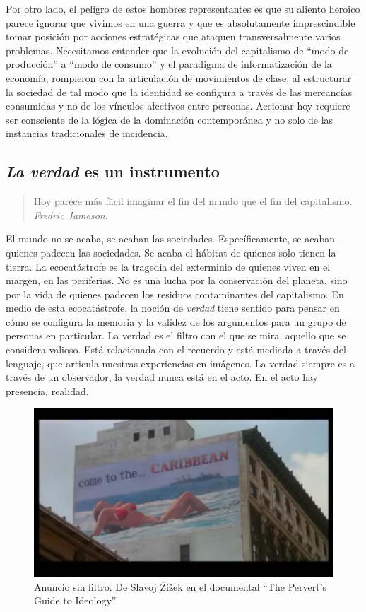 Por otro lado, el peligro de estos hombres representantes es que su aliento heroico parece ignorar que vivimos en una guerra y que es absolutamente imprescindible tomar posición por acciones estratégicas que ataquen transversalmente varios problemas. Necesitamos entender que la evolución del capitalismo de \enquote{modo de producción} a \enquote{modo de consumo} y el paradigma de informatización de la economía, rompieron con la articulación de movimientos de clase, al estructurar la sociedad de tal modo que la identidad se configura a través de las mercancías consumidas y no de los vínculos afectivos entre personas. Accionar hoy requiere ser consciente de la lógica de la dominación contemporánea y no solo de las instancias tradicionales de incidencia.

\subsection{\emph{La verdad} es un instrumento}
\label{sub:verdadinstrumental}

\begin{quote}
	Hoy parece más fácil imaginar el fin del mundo que el fin del
	capitalismo.\\ \emph{Fredric Jameson}.
\end{quote}

El mundo no se acaba, se acaban las sociedades. Específicamente, se acaban quienes padecen las sociedades. Se acaba el hábitat de quienes solo tienen la tierra. La ecocatástrofe es la tragedia del exterminio de quienes viven en el margen, en las periferias. No es una lucha por la conservación del planeta, sino por la vida de quienes padecen los residuos contaminantes del capitalismo. En medio de esta ecocatástrofe, la noción de \emph{verdad} tiene sentido para pensar en cómo se configura la memoria y la validez de los argumentos para un grupo de personas en particular. La verdad es el filtro con el que se mira, aquello que se considera valioso. Está relacionada con el recuerdo y está mediada a través del lenguaje, que articula nuestras experiencias en imágenes. La verdad siempre es a través de un observador, la verdad nunca está en el acto. En el acto hay presencia, realidad.

\begin{figure}[htbp]
	\centering
	\includegraphics[width=.8\linewidth]{images/ideology1.png}
	\caption[Anuncio sin filtro.]{Anuncio sin filtro. De Slavoj Žižek en el documental \enquote{The Pervert's Guide to Ideology}}
\end{figure}

